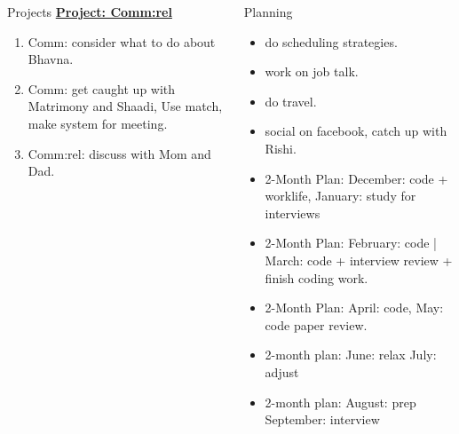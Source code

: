 \documentclass[serif, mathserif, final]{beamer}
\newcommand{\comments}[1]{}
\begin{document}
\begin{frame}
\begin{columns}
\begin{column}{0.5\textwidth}
\begin{block}{Projects}
{\underline{\textbf{Project: Comm:rel}}}
\begin{enumerate} 
  \tiny \item \tiny Comm: consider what to do about Bhavna.
\item \tiny Comm: get caught up with Matrimony and Shaadi, Use match, make system
  for meeting. 
\item \tiny Comm:rel: discuss with Mom and Dad. 
\end{enumerate} 
\end{block} 
\end{column}

\begin{column}{0.5\textwidth}
\begin{block}{Planning} 
\comments{
{\underline{\textit{2-month plans}}}
{\underline{\textit{January and February:}}}
{\underline{\textit{March and April:}} }
{\underline{\textit{May and June:}}}
}

\begin{itemize}
\tiny \item \tiny do scheduling strategies. 
\item \tiny work on job talk. 
\item \tiny do travel. 
\item \tiny social on facebook, catch up with Rishi. 
\end{itemize} 
\begin{itemize} 
\tiny \item \tiny 2-Month Plan: December: code + worklife, January: study for interviews
\item \tiny 2-Month Plan: February: code | March:  code + interview review + finish coding work. 
\item \tiny 2-Month Plan: April: code, May: code paper review.
\item \tiny 2-month plan: June: relax July: adjust 
\item \tiny 2-month plan: August:  prep September: interview 
\end{itemize}
\end{block}


\end{column}
\end{columns}
\end{frame}
\end{document}
